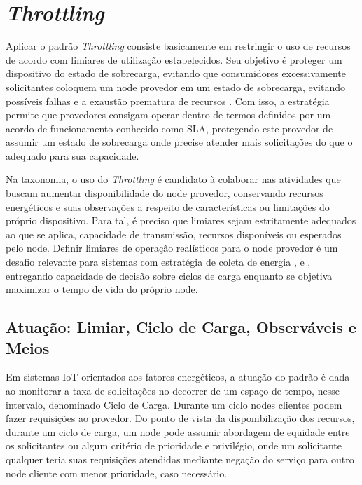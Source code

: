 \section{\textit{Throttling}}

Aplicar o padrão \textit{Throttling} consiste basicamente em restringir o uso de recursos de acordo com limiares de utilização estabelecidos. Seu objetivo é proteger um dispositivo do estado de sobrecarga, evitando que consumidores excessivamente solicitantes coloquem um node provedor em um estado de sobrecarga, evitando possíveis falhas e a exaustão prematura de recursos \cite{martinekuan_throttling_nodate}. Com isso, a estratégia permite que provedores consigam operar dentro de termos definidos por um acordo de funcionamento conhecido como \acf{SLA}, protegendo este provedor de assumir um estado de sobrecarga onde precise atender mais solicitações do que o adequado para sua capacidade.

Na taxonomia, o uso do \textit{Throttling} é candidato à colaborar nas atividades que buscam aumentar disponibilidade do node provedor, conservando  recursos energéticos e suas observações a respeito de características ou limitações do próprio dispositivo. Para tal, é preciso que limiares sejam estritamente adequados ao que se aplica, capacidade de transmissão, recursos disponíveis ou esperados pelo node. Definir limiares de operação realísticos para o node provedor é um desafio relevante para sistemas com estratégia de coleta de energia \cite{khairnar_discrete-rate_2015}, \cite{liu_energy_2016} e \cite{zhang_toward_2018}, entregando capacidade de decisão sobre ciclos de carga enquanto se objetiva maximizar o tempo de vida do próprio node.

\subsection{Atuação: Limiar, Ciclo de Carga, Observáveis e Meios}
Em sistemas \acs{IoT} orientados aos fatores energéticos, a atuação do padrão é dada ao monitorar a taxa de solicitações no decorrer de um espaço de tempo, nesse intervalo, denominado Ciclo de Carga. Durante um ciclo nodes clientes podem fazer requisições ao provedor. Do ponto de vista da disponibilização dos recursos, durante um ciclo de carga, um node pode assumir abordagem de equidade entre os solicitantes ou algum critério de prioridade e privilégio, onde um solicitante qualquer teria suas requisições atendidas mediante negação do serviço para outro node cliente com menor prioridade, caso necessário.

